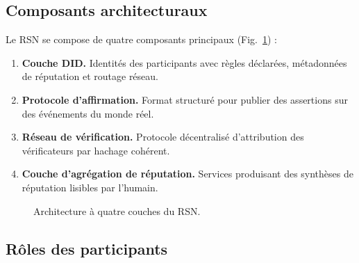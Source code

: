 \documentclass[11pt,a4paper,twocolumn]{article}
\begin{document}
\subsection{Composants architecturaux}

Le RSN se compose de quatre composants principaux (Fig.~\ref{fig:architecture}) :
\begin{enumerate}[nosep]
\item \textbf{Couche DID.} Identités des participants avec règles déclarées, métadonnées de réputation et routage réseau.
\item \textbf{Protocole d'affirmation.} Format structuré pour publier des assertions sur des événements du monde réel.
\item \textbf{Réseau de vérification.} Protocole décentralisé d'attribution des vérificateurs par hachage cohérent.
\item \textbf{Couche d'agrégation de réputation.} Services produisant des synthèses de réputation lisibles par l'humain.
\end{enumerate}

\begin{figure}[ht]
\centering
{}
\caption{Architecture à quatre couches du RSN.}
\label{fig:architecture}
\end{figure}

\subsection{Rôles des participants}
\end{document}

